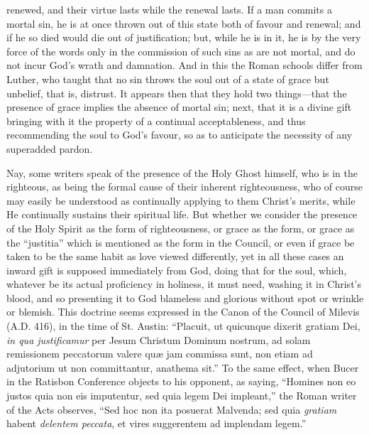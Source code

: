 renewed, and their virtue lasts while the renewal lasts. If a man
commits a mortal sin, he is at once thrown out of this state both of
favour and renewal; and if he so died would die out of justification;
but, while he is in it, he is by the very force of the words only in
the commission of such sins as are not mortal, and do not incur God's
wrath and damnation. And in this the Roman schools differ from Luther,
who taught that no sin throws the soul out of a state of grace but
unbelief, that is, distrust. It appears then that they hold two things—that
the presence of grace implies the absence of mortal sin; next, that it
is a divine gift bringing with it the property of a continual
acceptableness, and thus recommending the soul to God's favour, so as
to anticipate the necessity of any superadded pardon.

Nay, some writers speak of the presence of the Holy Ghost himself,
who is in the righteous, as being the formal cause of their inherent
righteousness, who of course may easily be understood as continually
applying to them Christ's merits, while He continually sustains their
spiritual life. But whether we consider the presence of the Holy
Spirit as the form of righteousness, or grace as the form, or grace as
the ``justitia'' which is mentioned as the form in the
Council, or even if grace be taken to be the same habit as love viewed
differently, yet in all these cases an inward gift is supposed
immediately from God, doing that for the soul, which, whatever be its
actual proficiency in holiness, it must need, washing it in Christ's
blood, and so presenting it to God blameless and glorious without spot
or wrinkle or blemish. This doctrine seems expressed in the Canon of
the Council of Milevis (A.D. 416), in the time of St. Austin: ``Placuit,
ut quicunque dixerit gratiam Dei, \emph{in qua justificamur} per Jesum
Christum Dominum nostrum, ad solam remissionem peccatorum valere quæ
jam commissa sunt, non etiam ad adjutorium ut non committantur,
anathema sit.'' To the same effect, when Bucer in the Ratisbon
Conference objects to his opponent, as saying, ``Homines non eo
justos quia non eis imputentur, sed quia legem Dei impleant,'' the
Roman writer of the Acts observes, ``Sed hoc non ita posuerat
Malvenda; sed quia \emph{gratiam} habent \emph{delentem peccata}, et
vires suggerentem ad implendam legem.''

